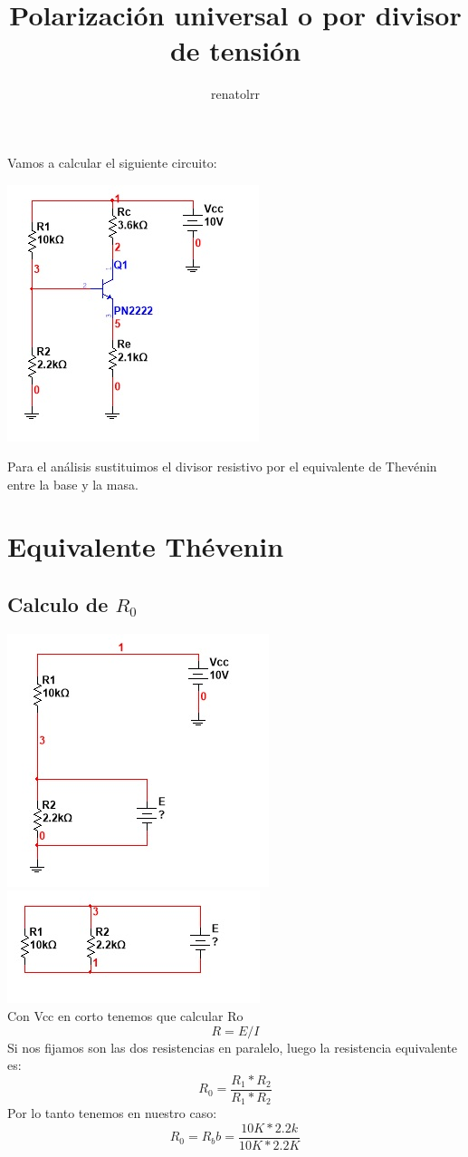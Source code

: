 \documentclass[10pt,a4paper]{article}
\author{renatolrr}
\title{Polarización universal o por divisor de tensión}
\begin{document}
\maketitle
Vamos a calcular el siguiente circuito:

\includegraphics[scale=1]{Images/Imagen1.jpg} 

Para el análisis sustituimos el divisor resistivo por el equivalente de Thevénin entre la base y la masa.

\section{Equivalente Thévenin}
\subsection{Calculo de $R_{0}$}
\includegraphics[scale=1]{Images/Imagen2.jpg}
\includegraphics[scale=1]{Images/Imagen3.jpg} 
\\
Con Vcc en corto tenemos que calcular Ro
\[R=E/I\]
Si nos fijamos son las dos resistencias en paralelo, luego la resistencia equivalente es:
\[R_{0}=\frac{R_{1}*R_{2}}{R_{1}*R_{2}}\]
Por lo tanto tenemos en nuestro caso:
\[R_{0}=R_bb=\frac{10K*2.2k}{10K*2.2K}\]
\end{document}
